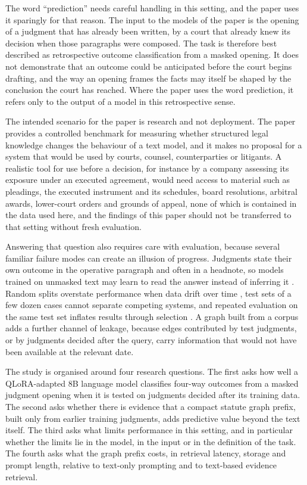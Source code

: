 \documentclass[journal]{IEEEtran}
\begin{document}
The word ``prediction'' needs careful handling in this setting, and the paper uses it sparingly for that reason. The input to the models of the paper is the opening of a judgment that has already been written, by a court that already knew its decision when those paragraphs were composed. The task is therefore best described as retrospective outcome classification from a masked opening. It does not demonstrate that an outcome could be anticipated before the court begins drafting, and the way an opening frames the facts may itself be shaped by the conclusion the court has reached. Where the paper uses the word prediction, it refers only to the output of a model in this retrospective sense.

The intended scenario for the paper is research and not deployment. The paper provides a controlled benchmark for measuring whether structured legal knowledge changes the behaviour of a text model, and it makes no proposal for a system that would be used by courts, counsel, counterparties or litigants. A realistic tool for use before a decision, for instance by a company assessing its exposure under an executed agreement, would need access to material such as pleadings, the executed instrument and its schedules, board resolutions, arbitral awards, lower-court orders and grounds of appeal, none of which is contained in the data used here, and the findings of this paper should not be transferred to that setting without fresh evaluation.

Answering that question also requires care with evaluation, because several familiar failure modes can create an illusion of progress. Judgments state their own outcome in the operative paragraph and often in a headnote, so models trained on unmasked text may learn to read the answer instead of inferring it \cite{r24}. Random splits overstate performance when data drift over time \cite{r25,r26}, test sets of a few dozen cases cannot separate competing systems, and repeated evaluation on the same test set inflates results through selection \cite{r27,r28}. A graph built from a corpus adds a further channel of leakage, because edges contributed by test judgments, or by judgments decided after the query, carry information that would not have been available at the relevant date.

The study is organised around four research questions. The first asks how well a QLoRA-adapted 8B language model classifies four-way outcomes from a masked judgment opening when it is tested on judgments decided after its training data. The second asks whether there is evidence that a compact statute graph prefix, built only from earlier training judgments, adds predictive value beyond the text itself. The third asks what limits performance in this setting, and in particular whether the limits lie in the model, in the input or in the definition of the task. The fourth asks what the graph prefix costs, in retrieval latency, storage and prompt length, relative to text-only prompting and to text-based evidence retrieval.
\end{document}
